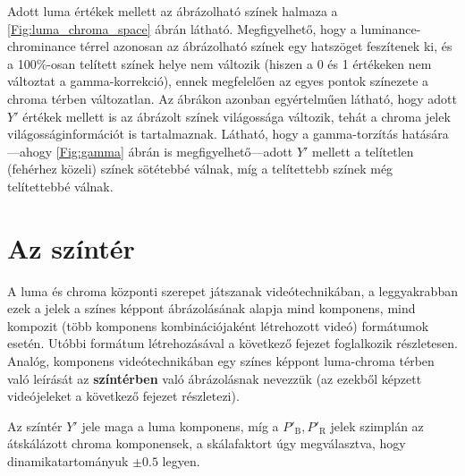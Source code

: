 Adott luma értékek mellett az ábrázolható színek halmaza a \ref{Fig:luma_chroma_space} ábrán látható.
Megfigyelhető, hogy a luminance-chrominance térrel azonosan az ábrázolható színek egy hatszöget feszítenek ki, és a 100\%-osan telített színek helye nem változik (hiszen a 0 és 1 értékeken nem változtat a gamma-korrekció), ennek megfelelően az egyes pontok színezete a chroma térben változatlan.
Az ábrákon azonban egyértelműen látható, hogy adott $Y'$ értékek mellett is az ábrázolt színek világossága változik, tehát a chroma jelek világosságinformációt is tartalmaznak.
Látható, hogy a gamma-torzítás hatására---ahogy \ref{Fig:gamma} ábrán is megfigyelhető---adott $Y'$ mellett a telítetlen (fehérhez közeli) színek sötétebbé válnak, míg a telítettebb színek még telítettebbé válnak. 


\section{Az \ypbpr színtér}

A luma és chroma központi szerepet játszanak videótechnikában, a leggyakrabban ezek a jelek a színes képpont ábrázolásának alapja mind komponens, mind kompozit (több komponens kombinációjaként létrehozott videó) formátumok esetén.
Utóbbi formátum létrehozásával a következő fejezet foglalkozik részletesen.
Analóg, komponens videótechnikában egy színes képpont luma-chroma térben való leírását az \textbf{\ypbpr színtérben} való ábrázolásnak nevezzük (az ezekből képzett \ypbpr videójeleket a következő fejezet részletezi).

Az \ypbpr színtér $Y'$ jele maga a luma komponens, míg a $P'_{\mathrm{B}}, P'_{\mathrm{R}}$ jelek szimplán az átskálázott chroma komponensek, a skálafaktort úgy megválasztva, hogy dinamikatartományuk $\pm 0.5$ legyen.

